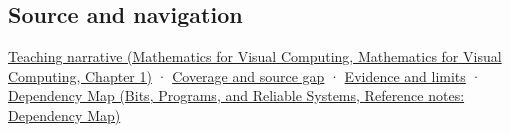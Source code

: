 \subsection{Source and navigation}\label{appendix-87d7626c8d37-source-and-navigation}

\href{../02-Mathematics-for-Visual-Computing/main.pdf\#nameddest=01-foundations-i-ch017-oriented-area-tells-us-which-side-of-the-panel-is-front}{Teaching narrative (Mathematics for Visual Computing, Mathematics for Visual Computing, Chapter 1)} · \hyperref[appendix-fd090d982a15-phase-6---parts-501-600]{Coverage and source gap} · \hyperref[appendix-a103e7846d21-phase-6---source-analysis-and-verification]{Evidence and limits} · \href{../01-Bits-Programs-and-Reliable-Systems/main.pdf\#nameddest=appendix-4ad47bdd269a}{Dependency Map (Bits, Programs, and Reliable Systems, Reference notes: Dependency Map)}
